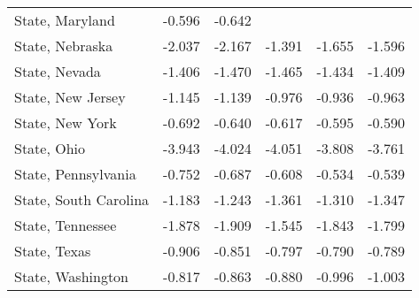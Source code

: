 {\begin{center}
{\begin{longtable}{l*{5}{c}}
            State, Maryland                  & -0.596                & -0.642                &                       &                       &                       \\
            \addlinespace
            State, Nebraska                  & -2.037\sym{*}         & -2.167\sym{*}         & -1.391                & -1.655                & -1.596                \\
            \addlinespace
            State, Nevada                    & -1.406                & -1.470                & -1.465                & -1.434                & -1.409                \\
            \addlinespace
            State, New Jersey                & -1.145                & -1.139                & -0.976                & -0.936                & -0.963                \\
            \addlinespace
            State, New York                  & -0.692\sym{**}        & -0.640\sym{*}         & -0.617\sym{*}         & -0.595\sym{*}         & -0.590\sym{*}         \\
            \addlinespace
            State, Ohio                      & -3.943\sym{***}       & -4.024\sym{***}       & -4.051\sym{***}       & -3.808\sym{***}       & -3.761\sym{***}       \\
            \addlinespace
            State, Pennsylvania              & -0.752                & -0.687                & -0.608                & -0.534                & -0.539                \\
            \addlinespace
            State, South Carolina            & -1.183                & -1.243                & -1.361                & -1.310                & -1.347                \\
            \addlinespace
            State, Tennessee                 & -1.878\sym{**}        & -1.909\sym{**}        & -1.545\sym{*}         & -1.843\sym{**}        & -1.799\sym{**}        \\
            \addlinespace
            State, Texas                     & -0.906\sym{**}        & -0.851\sym{**}        & -0.797\sym{**}        & -0.790\sym{**}        & -0.789\sym{**}        \\
            \addlinespace
            State, Washington                & -0.817                & -0.863\sym{*}         & -0.880\sym{*}         & -0.996\sym{**}        & -1.003\sym{**}        \\



\end{longtable}}
\end{center}}
